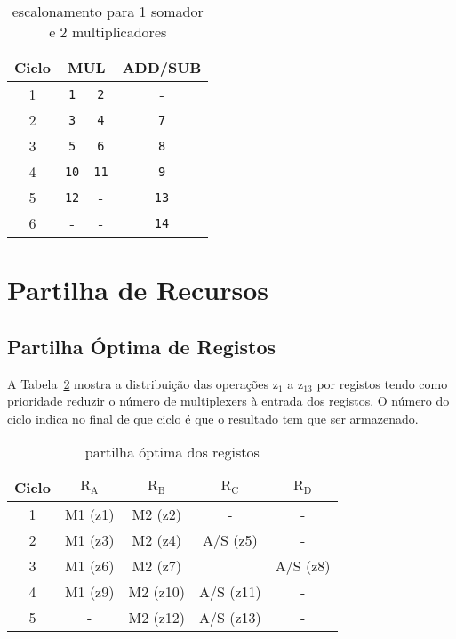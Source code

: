 \documentclass[a4paper]{article}
\begin{document}
\begin{table}[H]
\centering
\begin{tabular}{|c||c|c|c|}
\hline 
Ciclo & \multicolumn{2}{c|}{MUL} & ADD/SUB \\ 
\hline
\hline 
1 & \texttt{1} & \texttt{2} & - \\ 
\hline 
2 & \texttt{3} & \texttt{4} & \texttt{7} \\ 
\hline 
3 & \texttt{5} & \texttt{6} & \texttt{8} \\ 
\hline 
4 & \texttt{10} & \texttt{11} & \texttt{9} \\ 
\hline 
5 & \texttt{12} & - & \texttt{13} \\ 
\hline 
6 & - & - & \texttt{14} \\ 
\hline 
\end{tabular} 
\caption{escalonamento para 1 somador \\
e 2 multiplicadores}
\label{tab:escalonamento2M1AS}
\end{table}


\section{Partilha de Recursos}
\subsection{Partilha Óptima de Registos}
\label{subsec:partilha_optim_registos}

A Tabela~\ref{tab:binding_optim_reg} mostra a distribuição das operações $\mathrm{z_1}$ a $\mathrm{z_{13}}$ por registos tendo como prioridade reduzir o número de multiplexers à entrada dos registos. O número do ciclo indica no final de que ciclo é que o resultado tem que ser armazenado.

\begin{table}[H]
\centering
\begin{tabular}{|c||c|c|c|c|}
\hline 
Ciclo & $\mathrm{R_A}$ & $\mathrm{R_B}$ & $\mathrm{R_C}$ & $\mathrm{R_D}$ \\ 
\hline 
\hline
1 & M1 (z1) & M2 (z2) & - & - \\ 
\hline 
2 & M1 (z3) & M2 (z4) & A/S (z5) & - \\ 
\cline{1-3}\cline{5-5}
3 & M1 (z6) & M2 (z7) &  & A/S (z8) \\ 
\hline 
4 & M1 (z9) & M2 (z10) & A/S (z11) & - \\ 
\hline 
5 & - & M2 (z12) & A/S (z13) & - \\ 
\hline 
\end{tabular}
\caption{partilha óptima dos registos}
\label{tab:binding_optim_reg}
\end{table}
\end{document}
